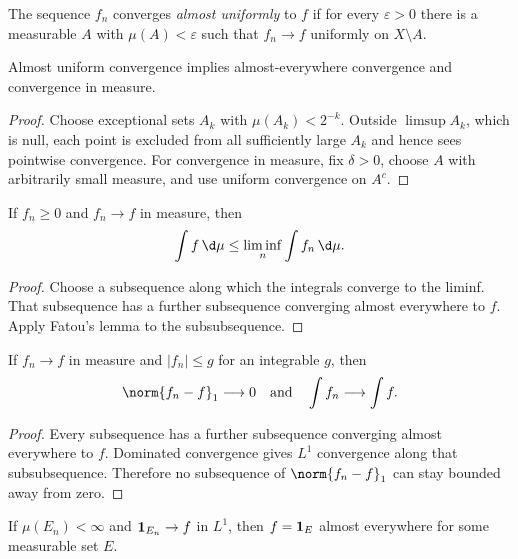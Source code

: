 \begin{de}
The sequence $f_n$ converges \emph{almost uniformly} to $f$ if for every $\varepsilon>0$ there is a measurable $A$ with $\mu(A)<\varepsilon$ such that $f_n\to f$ uniformly on $X\setminus A$.
\end{de}

\begin{prop}
Almost uniform convergence implies almost-everywhere convergence and convergence in measure.
\end{prop}

\begin{proof}
Choose exceptional sets $A_k$ with $\mu(A_k)<2^{-k}$. Outside $\limsup A_k$, which is null, each point is excluded from all sufficiently large $A_k$ and hence sees pointwise convergence. For convergence in measure, fix $\delta>0$, choose $A$ with arbitrarily small measure, and use uniform convergence on $A^c$.
\end{proof}

\begin{thm}
If $f_n\geq0$ and $f_n\to f$ in measure, then
\[
\int f\,\d\mu\leq\liminf_n\int f_n\,\d\mu.
\]
\end{thm}

\begin{proof}
Choose a subsequence along which the integrals converge to the liminf. That subsequence has a further subsequence converging almost everywhere to $f$. Apply Fatou's lemma to the subsubsequence.
\end{proof}

\begin{thm}
If $f_n\to f$ in measure and $|f_n|\leq g$ for an integrable $g$, then
\[
\norm{f_n-f}_1\longrightarrow0
\quad\text{and}\quad
\int f_n\longrightarrow\int f.
\]
\end{thm}

\begin{proof}
Every subsequence has a further subsequence converging almost everywhere to $f$. Dominated convergence gives $L^1$ convergence along that subsubsequence. Therefore no subsequence of $\norm{f_n-f}_1$ can stay bounded away from zero.
\end{proof}

\begin{prop}
If $\mu(E_n)<\infty$ and $\mathbf{1}_{E_n}\to f$ in $L^1$, then $f=\mathbf{1}_E$ almost everywhere for some measurable set $E$.
\end{prop}

